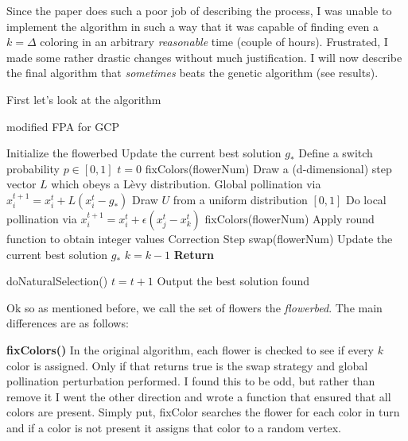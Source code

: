 Since the paper does such a poor job of describing the process, I was unable to implement the algorithm in such a way that it was capable of finding even a $k = \Delta$ coloring in an arbitrary \emph{reasonable} time (couple of hours). Frustrated, I made some rather drastic changes without much justification. I will now describe the final algorithm that \emph{sometimes} beats the genetic algorithm (see results).

First let's look at the algorithm

\begin{algorithm}[H]
    \caption{modified FPA for GCP}
    \label{FPA2}
    \begin{algorithmic}[1] %
         			
			\State Initialize the flowerbed
			\State Update the current best solution $g_*$
			\State Define a switch probability $p \in [0,1]$
			\State $t=0$
					\State fixColors(flowerNum)
					 
						\State Draw a (d-dimensional) step vector $L$ which obeys a L\`evy distribution.
						\State Global pollination via $x_i^{t+1} = x_i^{t} + L(x_i^{t} - g_*)$
					\Else
						\State Draw $U$ from a uniform distribution $[0,1]$
						\State Do local pollination via $x_i^{t+1} = x_i^{t} + \epsilon(x_j^{t} - x_k^{t})$
					\EndIf
					\State fixColors(flowerNum)
					\State Apply round function to obtain integer values
					\State Correction Step 
					 
						\State swap(flowerNum)
					\EndFor
				\EndFor
				\State Update the current best solution $g_*$
					\State $k = k-1$
					\State \textbf{Return}
				\EndIf

				\State doNaturalSelection()
				\State $t = t+1$
			\EndWhile
			\State Output the best solution found
		\EndProcedure
    \end{algorithmic}
\end{algorithm}

Ok so as mentioned before, we call the set of flowers the \emph{flowerbed}. The main differences are as follows:

\textbf{fixColors()}
In the original algorithm, each flower is checked to see if every $k$ color is assigned. Only if that returns true is the swap strategy and global pollination perturbation performed. I found this to be odd, but rather than remove it I went the other direction and wrote a function that ensured that all colors are present. Simply put, fixColor searches the flower for each color in turn and if a color is not present it assigns that color to a random vertex.

